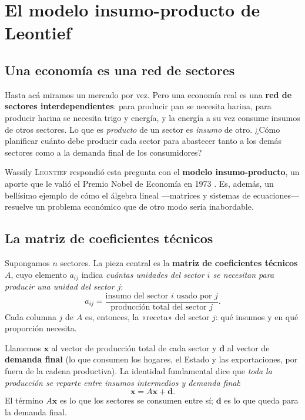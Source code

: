 \chapter{El modelo insumo-producto de Leontief}
\label{cap:leontief}

\section{Una economía es una red de sectores}

Hasta acá miramos un mercado por vez. Pero una economía real es una \textbf{red de sectores interdependientes}: para producir pan se necesita harina, para producir harina se necesita trigo y energía, y la energía a su vez consume insumos de otros sectores. Lo que es \emph{producto} de un sector es \emph{insumo} de otro. ¿Cómo planificar cuánto debe producir cada sector para abastecer tanto a los demás sectores como a la demanda final de los consumidores?

Wassily \textsc{Leontief} respondió esta pregunta con el \textbf{modelo insumo-producto}, un aporte que le valió el Premio Nobel de Economía en 1973 \cite{leontief}. Es, además, un bellísimo ejemplo de cómo el álgebra lineal —matrices y sistemas de ecuaciones— resuelve un problema económico que de otro modo sería inabordable.

\section{La matriz de coeficientes técnicos}

Supongamos $n$ sectores. La pieza central es la \textbf{matriz de coeficientes técnicos} $A$, cuyo elemento $a_{ij}$ indica \emph{cuántas unidades del sector $i$ se necesitan para producir una unidad del sector $j$}:
\begin{equation}
a_{ij} = \frac{\text{insumo del sector } i \text{ usado por } j}{\text{producción total del sector } j}.
\end{equation}
Cada columna $j$ de $A$ es, entonces, la «receta» del sector $j$: qué insumos y en qué proporción necesita.

Llamemos $\mathbf{x}$ al vector de producción total de cada sector y $\mathbf{d}$ al vector de \textbf{demanda final} (lo que consumen los hogares, el Estado y las exportaciones, por fuera de la cadena productiva). La identidad fundamental dice que \emph{toda la producción se reparte entre insumos intermedios y demanda final}:
\begin{equation}
\mathbf{x} = A\mathbf{x} + \mathbf{d}.
\label{eq:leontief_base}
\end{equation}
El término $A\mathbf{x}$ es lo que los sectores se consumen entre sí; $\mathbf{d}$ es lo que queda para la demanda final.


